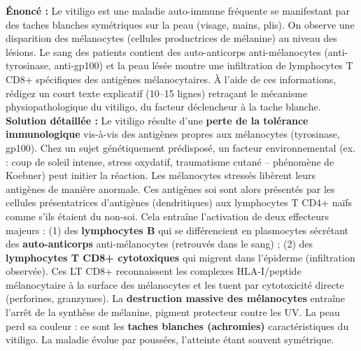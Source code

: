 \documentclass[11pt]{article}
\newcommand{\cle}[1]{{\popxbold\color{popdark}#1}}
\begin{document}
\begin{exoresolu}
\textbf{Énoncé :} Le vitiligo est une maladie auto-immune fréquente se manifestant par des taches blanches symétriques sur la peau (visage, mains, plis). On observe une disparition des mélanocytes (cellules productrices de mélanine) au niveau des lésions. Le sang des patients contient des auto-anticorps anti-mélanocytes (anti-tyrosinase, anti-gp100) et la peau lésée montre une infiltration de lymphocytes T CD8+ spécifiques des antigènes mélanocytaires.
À l'aide de ces informations, rédigez un court texte explicatif (10--15 lignes) retraçant le mécanisme physiopathologique du vitiligo, du facteur déclencheur à la tache blanche.
\tcblower
\textbf{Solution détaillée :}
Le vitiligo résulte d'une \textbf{perte de la tolérance immunologique} vis-à-vis des antigènes propres aux mélanocytes (tyrosinase, gp100). Chez un sujet génétiquement prédisposé, un facteur environnemental (ex. : coup de soleil intense, stress oxydatif, traumatisme cutané -- phénomène de Koebner) peut initier la réaction. Les mélanocytes stressés libèrent leurs antigènes de manière anormale. Ces antigènes \cle{soi} sont alors présentés par les cellules présentatrices d'antigènes (dendritiques) aux lymphocytes T CD4+ naïfs comme s'ils étaient du \cle{non-soi}. Cela entraîne l'activation de deux effecteurs majeurs : (1) des \textbf{lymphocytes B} qui se différencient en plasmocytes sécrétant des \textbf{auto-anticorps} anti-mélanocytes (retrouvés dans le sang) ; (2) des \textbf{lymphocytes T CD8+ cytotoxiques} qui migrent dans l'épiderme (infiltration observée). Ces LT CD8+ reconnaissent les complexes HLA-I/peptide mélanocytaire à la surface des mélanocytes et les tuent par cytotoxicité directe (perforines, granzymes). La \textbf{destruction massive des mélanocytes} entraîne l'arrêt de la synthèse de mélanine, pigment protecteur contre les UV. La peau perd sa couleur : ce sont les \textbf{taches blanches (achromies)} caractéristiques du vitiligo. La maladie évolue par poussées, l'atteinte étant souvent symétrique.
\end{exoresolu}
\end{document}
